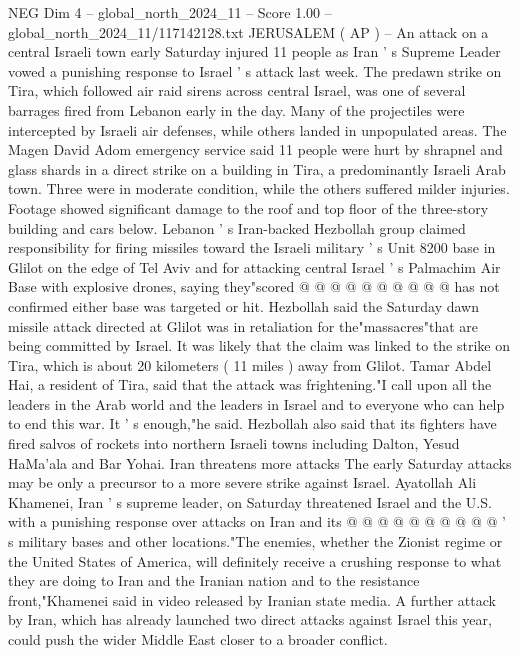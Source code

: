 \begin{textsample}{NEG Dim 4 – global\_north\_2024\_11 – Score 1.00 – global\_north\_2024\_11/117142128.txt}  \label{ex:f4_neg_180}
JERUSALEM ( AP ) -- An attack on a central Israeli town early Saturday injured 11 people as Iran ' s Supreme Leader vowed a punishing response to Israel ' s attack last week.
The predawn strike on Tira, which followed air raid sirens across central Israel, was one of several barrages fired from Lebanon early in the day.
Many of the projectiles were intercepted by Israeli air defenses, while others landed in unpopulated areas.
The Magen David Adom emergency service said 11 people were hurt by shrapnel and glass shards in a direct strike on a building in Tira, a predominantly Israeli Arab town.
Three were in moderate condition, while the others suffered milder injuries.
Footage showed significant damage to the roof and top floor of the three-story building and cars below.
Lebanon ' s Iran-backed Hezbollah group claimed responsibility for firing missiles toward the Israeli military ' s Unit 8200 base in Glilot on the edge of Tel Aviv and for attacking central Israel ' s Palmachim Air Base with explosive drones, saying they"scored @ @ @ @ @ @ @ @ @ @ has not confirmed either base was targeted or hit.
Hezbollah said the Saturday dawn missile attack directed at Glilot was in retaliation for the"massacres"that are being committed by Israel.
It was likely that the claim was linked to the strike on Tira, which is about 20 kilometers ( 11 miles ) away from Glilot.
Tamar Abdel Hai, a resident of Tira, said that the attack was frightening."I call upon all the leaders in the Arab world and the leaders in Israel and to everyone who can help to end this war.
It ' s enough,"he said.
Hezbollah also said that its fighters have fired salvos of rockets into northern Israeli towns including Dalton, Yesud HaMa'ala and Bar Yohai.
Iran threatens more attacks The early Saturday attacks may be only a precursor to a more severe strike against Israel.
Ayatollah Ali Khamenei, Iran ' s supreme leader, on Saturday threatened Israel and the U.S. with a punishing response over attacks on Iran and its @ @ @ @ @ @ @ @ @ @ ' s military bases and other locations."The enemies, whether the Zionist regime or the United States of America, will definitely receive a crushing response to what they are doing to Iran and the Iranian nation and to the resistance front,"Khamenei said in video released by Iranian state media.
A further attack by Iran, which has already launched two direct attacks against Israel this year, could push the wider Middle East closer to a broader conflict.

\end{textsample}
